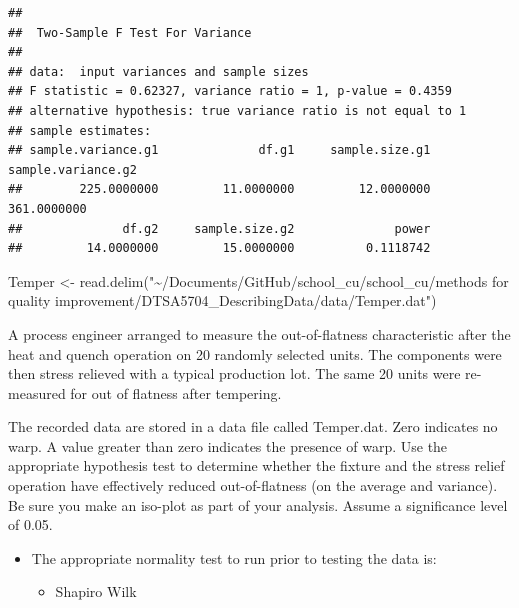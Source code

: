 \documentclass[
]{article}
\newenvironment{Shaded}{\begin{snugshade}}{\end{snugshade}}
\newcommand{\CommentTok}[1]{\textcolor[rgb]{0.56,0.35,0.01}{\textit{#1}}}
\newcommand{\FunctionTok}[1]{\textcolor[rgb]{0.00,0.00,0.00}{#1}}
\newcommand{\NormalTok}[1]{#1}
\newcommand{\OtherTok}[1]{\textcolor[rgb]{0.56,0.35,0.01}{#1}}
\newcommand{\SpecialCharTok}[1]{\textcolor[rgb]{0.00,0.00,0.00}{#1}}
\newcommand{\StringTok}[1]{\textcolor[rgb]{0.31,0.60,0.02}{#1}}
\providecommand{\tightlist}{%
  \setlength{\itemsep}{0pt}\setlength{\parskip}{0pt}}
\begin{document}
\begin{verbatim}
## 
##  Two-Sample F Test For Variance
## 
## data:  input variances and sample sizes
## F statistic = 0.62327, variance ratio = 1, p-value = 0.4359
## alternative hypothesis: true variance ratio is not equal to 1
## sample estimates:
## sample.variance.g1              df.g1     sample.size.g1 sample.variance.g2 
##        225.0000000         11.0000000         12.0000000        361.0000000 
##              df.g2     sample.size.g2              power 
##         14.0000000         15.0000000          0.1118742
\end{verbatim}

\begin{Shaded}
\begin{Highlighting}[]
\NormalTok{ Temper }\OtherTok{\textless{}{-}} \FunctionTok{read.delim}\NormalTok{(}\StringTok{"\textasciitilde{}/Documents/GitHub/school\_cu/school\_cu/methods for quality improvement/DTSA5704\_DescribingData/data/Temper.dat"}\NormalTok{)}
\end{Highlighting}
\end{Shaded}

A process engineer arranged to measure the out-of-flatness
characteristic after the heat and quench operation on 20 randomly
selected units. The components were then stress relieved with a typical
production lot. The same 20 units were re-measured for out of flatness
after tempering.

The recorded data are stored in a data file called Temper.dat. Zero
indicates no warp. A value greater than zero indicates the presence of
warp. Use the appropriate hypothesis test to determine whether the
fixture and the stress relief operation have effectively reduced
out-of-flatness (on the average and variance). Be sure you make an
iso-plot as part of your analysis. Assume a significance level of 0.05.

\begin{itemize}
\tightlist
\item
  The appropriate normality test to run prior to testing the data is:

  \begin{itemize}
  \tightlist
  \item
    Shapiro Wilk
  \end{itemize}
\end{itemize}

\begin{Shaded}
\end{Shaded}
\end{document}
